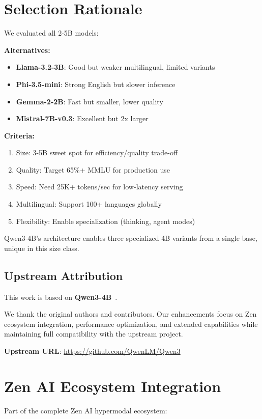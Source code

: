 \documentclass[11pt,a4paper]{article}
\begin{document}
\section{Selection Rationale}
We evaluated all 2-5B models:

\textbf{Alternatives:}
\begin{itemize}
    \item \textbf{Llama-3.2-3B}: Good but weaker multilingual, limited variants
    \item \textbf{Phi-3.5-mini}: Strong English but slower inference
    \item \textbf{Gemma-2-2B}: Fast but smaller, lower quality
    \item \textbf{Mistral-7B-v0.3}: Excellent but 2x larger
\end{itemize}

\textbf{Criteria:}
\begin{enumerate}
    \item Size: 3-5B sweet spot for efficiency/quality trade-off
    \item Quality: Target 65\%+ MMLU for production use
    \item Speed: Need 25K+ tokens/sec for low-latency serving
    \item Multilingual: Support 100+ languages globally
    \item Flexibility: Enable specialization (thinking, agent modes)
\end{enumerate}

Qwen3-4B's architecture enables three specialized 4B variants from a single base, unique in this size class.

\subsection{Upstream Attribution}
This work is based on \textbf{Qwen3-4B}~\cite{upstream2025}.

We thank the original authors and contributors. Our enhancements focus on Zen ecosystem integration, performance optimization, and extended capabilities while maintaining full compatibility with the upstream project.

\textbf{Upstream URL}: \url{https://github.com/QwenLM/Qwen3}

\section{Zen AI Ecosystem Integration}

Part of the complete Zen AI hypermodal ecosystem:
\end{document}
